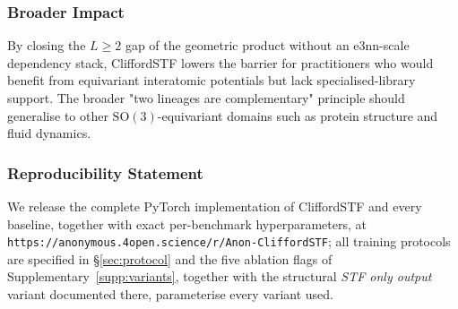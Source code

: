 \subsubsection*{Broader Impact}
By closing the $L \geq 2$ gap of the geometric product without an e3nn-scale dependency stack, CliffordSTF lowers the barrier for practitioners who would benefit from equivariant interatomic potentials but lack specialised-library support. The broader "two lineages are complementary" principle should generalise to other $\mathrm{SO}(3)$-equivariant domains such as protein structure and fluid dynamics.

\subsubsection*{Reproducibility Statement}
We release the complete PyTorch implementation of CliffordSTF and every baseline, together with exact per-benchmark hyperparameters, at \texttt{https://anonymous.4open.science/r/Anon-CliffordSTF}; all training protocols are specified in \S\ref{sec:protocol} and the five ablation flags of Supplementary~\ref{supp:variants}, together with the structural \emph{STF only output} variant documented there, parameterise every variant used.
